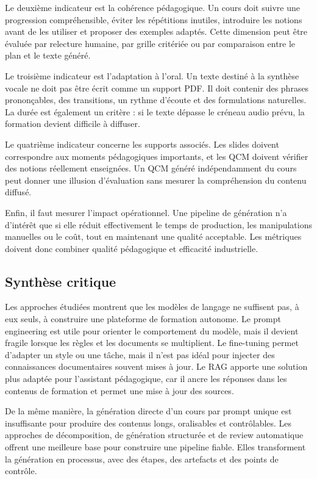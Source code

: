Le deuxième indicateur est la cohérence pédagogique. Un cours doit suivre une progression
compréhensible, éviter les répétitions inutiles, introduire les notions avant de les utiliser
et proposer des exemples adaptés. Cette dimension peut être évaluée par relecture humaine,
par grille critériée ou par comparaison entre le plan et le texte généré.

Le troisième indicateur est l'adaptation à l'oral. Un texte destiné à la synthèse vocale ne
doit pas être écrit comme un support PDF. Il doit contenir des phrases prononçables, des
transitions, un rythme d'écoute et des formulations naturelles. La durée est également
un critère : si le texte dépasse le créneau audio prévu, la formation devient difficile à
diffuser.

Le quatrième indicateur concerne les supports associés. Les slides doivent correspondre
aux moments pédagogiques importants, et les QCM doivent vérifier des notions réellement
enseignées. Un QCM généré indépendamment du cours peut donner une illusion
d'évaluation sans mesurer la compréhension du contenu diffusé.

Enfin, il faut mesurer l'impact opérationnel. Une pipeline de génération n'a d'intérêt que
si elle réduit effectivement le temps de production, les manipulations manuelles ou le
coût, tout en maintenant une qualité acceptable. Les métriques doivent donc combiner
qualité pédagogique et efficacité industrielle.

\subsection{Synthèse critique}

Les approches étudiées montrent que les modèles de langage ne suffisent pas, à eux
seuls, à construire une plateforme de formation autonome. Le prompt engineering est
utile pour orienter le comportement du modèle, mais il devient fragile lorsque les règles
et les documents se multiplient. Le fine-tuning permet d'adapter un style ou une tâche,
mais il n'est pas idéal pour injecter des connaissances documentaires souvent mises à
jour. Le RAG apporte une solution plus adaptée pour l'assistant pédagogique, car il
ancre les réponses dans les contenus de formation et permet une mise à jour des sources.

De la même manière, la génération directe d'un cours par prompt unique est insuffisante
pour produire des contenus longs, oralisables et contrôlables. Les approches de
décomposition, de génération structurée et de review automatique offrent une meilleure
base pour construire une pipeline fiable. Elles transforment la génération en processus,
avec des étapes, des artefacts et des points de contrôle.

